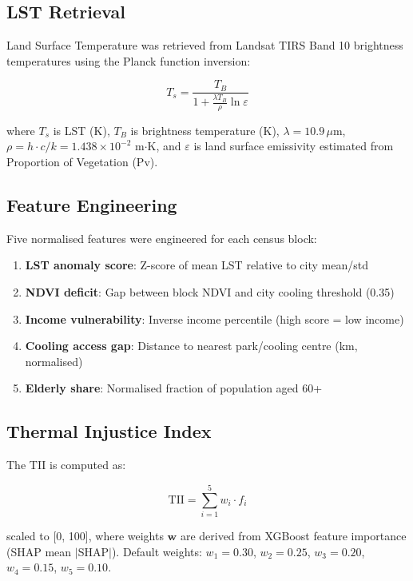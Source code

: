 \documentclass[12pt, a4paper]{article}
\begin{document}
\subsection{LST Retrieval}

Land Surface Temperature was retrieved from Landsat TIRS Band 10 brightness
temperatures using the Planck function inversion:

\begin{equation}
  T_s = \frac{T_B}{1 + \frac{\lambda T_B}{\rho} \ln \varepsilon}
\end{equation}

where $T_s$ is LST (K), $T_B$ is brightness temperature (K), $\lambda = 10.9\,\mu\text{m}$,
$\rho = h \cdot c / k = 1.438 \times 10^{-2}$ m$\cdot$K, and $\varepsilon$ is
land surface emissivity estimated from Proportion of Vegetation (Pv).

\subsection{Feature Engineering}

Five normalised features were engineered for each census block:

\begin{enumerate}
  \item \textbf{LST anomaly score}: Z-score of mean LST relative to city mean/std
  \item \textbf{NDVI deficit}: Gap between block NDVI and city cooling threshold (0.35)
  \item \textbf{Income vulnerability}: Inverse income percentile (high score = low income)
  \item \textbf{Cooling access gap}: Distance to nearest park/cooling centre (km, normalised)
  \item \textbf{Elderly share}: Normalised fraction of population aged 60+
\end{enumerate}

\subsection{Thermal Injustice Index}

The TII is computed as:

\begin{equation}
  \text{TII} = \sum_{i=1}^{5} w_i \cdot f_i
\end{equation}

scaled to [0, 100], where weights $\mathbf{w}$ are derived from XGBoost feature
importance (SHAP mean $|$SHAP$|$). Default weights: $w_1 = 0.30$, $w_2 = 0.25$,
$w_3 = 0.20$, $w_4 = 0.15$, $w_5 = 0.10$.
\end{document}
